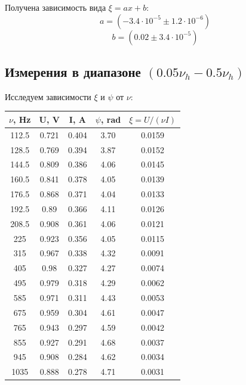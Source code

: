 \documentclass{article}
\begin{document}
Получена зависимость вида \( \xi = ax + b \):
\[ a = (-3.4\cdot 10^{-5} \pm 1.2\cdot 10^{-6}) \]
\[ b = (0.02 \pm 3.4\cdot 10^{-5}) \]
\subsection{Измерения в диапазоне \((0.05\nu_h - 0.5\nu_h)\)}
Исследуем зависимости \(\xi\) и \(\psi\) от \(\nu\):
\begin{table}[H]
    \centering
    \begin{tabular}{|c|c|c|c|c|}
    \hline
    \(\nu\), Hz & U, V  & I, A  & \(\psi\), rad & \(\xi = U/(\nu I)\) \\\hline
    112.5  & 0.721 & 0.404 & 3.70 & 0.0159\\\hline
    128.5  & 0.769 & 0.394 & 3.87 & 0.0152\\\hline
    144.5  & 0.809 & 0.386 & 4.06 & 0.0145\\\hline
    160.5  & 0.841 & 0.378 & 4.05 & 0.0139\\\hline
    176.5  & 0.868 & 0.371 & 4.04 & 0.0133\\\hline
    192.5  & 0.89  & 0.366 & 4.11 & 0.0126\\\hline
    208.5  & 0.908 & 0.361 & 4.06 & 0.0121\\\hline
    225 & 0.923 & 0.356 & 4.05 & 0.0115\\\hline
    315 & 0.967 & 0.338 & 4.32 & 0.0091\\\hline
    405 & 0.98  & 0.327 & 4.27 & 0.0074\\\hline
    495 & 0.979 & 0.318 & 4.29 & 0.0062\\\hline
    585 & 0.971 & 0.311 & 4.43 & 0.0053\\\hline
    675 & 0.959 & 0.304 & 4.61 & 0.0047\\\hline
    765 & 0.943 & 0.297 & 4.59 & 0.0042\\\hline
    855 & 0.927 & 0.291 & 4.68 & 0.0037\\\hline
    945 & 0.908 & 0.284 & 4.62 & 0.0034\\\hline
    1035& 0.888 & 0.278 & 4.71 & 0.0031\\\hline
    \end{tabular}
\end{table}
\end{document}
